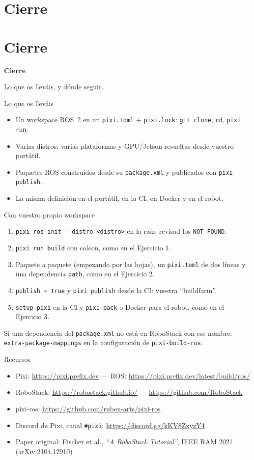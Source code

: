\documentclass[aspectratio=169]{beamer}
\newcommand{\separador}[2]{%
\begin{frame}
  \centering
  \vfill
  {\usebeamercolor[fg]{structure}\fontsize{34}{40}\selectfont\bfseries #1\par}
  \vspace{1.2em}
  {\Large\color{halfgray} #2\par}
  \vfill
\end{frame}%
}
\newcommand{\seccion}[3][]{%
  \if\relax\detokenize{#1}\relax\section{#2}\else\section[#1]{#2}\fi
  \separador{#2}{#3}%
}
\begin{document}
\seccion{Cierre}{Lo que os lleváis, y dónde seguir.}

\begin{frame}{Lo que os lleváis}
\begin{itemize}
    \item Un workspace ROS~2 en un \lstinline|pixi.toml| + \lstinline|pixi.lock|: \lstinline|git clone|, \lstinline|cd|, \lstinline|pixi run|.
    \item Varias distros, varias plataformas y GPU/Jetson resueltas desde vuestro portátil.
    \item Paquetes ROS construidos desde su \lstinline|package.xml| y publicados con \lstinline|pixi publish|.
    \item La misma definición en el portátil, en la CI, en Docker y en el robot.
\end{itemize}
\end{frame}

\begin{frame}{Con vuestro propio workspace}
\begin{enumerate}
    \item \lstinline|pixi-ros init --distro <distro>| en la raíz: revisad los \texttt{NOT FOUND}.
    \item \lstinline|pixi run build| con colcon, como en el Ejercicio 1.
    \item Paquete a paquete (empezando por las hojas), un \lstinline|pixi.toml| de dos líneas y una dependencia \texttt{path}, como en el Ejercicio 2.
    \item \lstinline|publish = true| y \lstinline|pixi publish| desde la CI: vuestra ``buildfarm''.
    \item \lstinline|setup-pixi| en la CI y \lstinline|pixi-pack| o Docker para el robot, como en el Ejercicio 3.
\end{enumerate}
\vfill
\small Si una dependencia del \lstinline|package.xml| no está en RoboStack con ese nombre: \texttt{extra-package-mappings} en la configuración de \texttt{pixi-build-ros}.
\end{frame}

\begin{frame}{Recursos}
\small
\begin{itemize}
    \item Pixi: \url{https://pixi.prefix.dev} — ROS: \url{https://pixi.prefix.dev/latest/build/ros/}
    \item RoboStack: \url{https://robostack.github.io/} — \url{https://github.com/RoboStack}
    \item pixi-ros: \url{https://github.com/ruben-arts/pixi-ros}
    \item Discord de Pixi, canal \texttt{\#pixi}: \url{https://discord.gg/kKV8ZxyzY4}
    \item Paper original: Fischer et al., \emph{``A RoboStack Tutorial''}, IEEE RAM 2021 (arXiv:2104.12910)
\end{itemize}
\end{frame}
\end{document}
